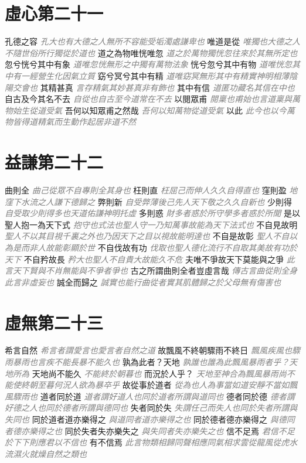 \documentclass[a4paper,zihao=-4,oneside,landscape,UTF8]{ctexart}
\newcommand{\zhushi}[1]{\scriptsize{\textit{\textcolor{gray}{#1}}}\normalsize}
\begin{document}
\section{虛心第二十一}

孔德之容
\zhushi{孔大也有大德之人無所不容能受垢濁處謙卑也}
唯道是從
\zhushi{唯獨也大德之人不隨世俗所行獨從於道也}
道之為物唯恍唯忽
\zhushi{道之於萬物獨恍忽往來於其無所定也}
忽兮恍兮其中有象
\zhushi{道唯忽恍無形之中獨有萬物法象}
恍兮忽兮其中有物
\zhushi{道唯恍忽其中有一經營生化因氣立質}
窈兮冥兮其中有精
\zhushi{道唯窈冥無形其中有精實神明相薄陰陽交會也}
其精甚真
\zhushi{言存精氣其妙甚真非有飾也}
其中有信
\zhushi{道匿功藏名其信在中也}
自古及今其名不去
\zhushi{自從也自古至今道常在不去}
以閱眾甫
\zhushi{閱稟也甫始也言道稟與萬物始生從道受氣}
吾何以知眾甫之然哉
\zhushi{吾何以知萬物從道受氣}
以此
\zhushi{此今也以今萬物皆得道精氣而生動作起居非道不然}


\section{益謙第二十二}

曲則全
\zhushi{曲己從眾不自專則全其身也}
枉則直
\zhushi{枉屈己而伸人久久自得直也}
窪則盈
\zhushi{地窪下水流之人謙下德歸之}
弊則新
\zhushi{自受弊薄後己先人天下敬之久久自新也}
少則得
\zhushi{自受取少則得多也天道佑謙神明托虛}
多則惑
\zhushi{財多者惑於所守學多者惑於所聞}
是以聖人抱一為天下式
\zhushi{抱守也式法也聖人守一乃知萬事故能為天下法式也}
不自見故明
\zhushi{聖人不以其目視千裏之外也乃因天下之目以視故能明達也}
不自是故彰
\zhushi{聖人不自以為是而非人故能彰顯於世}
不自伐故有功
\zhushi{伐取也聖人德化流行不自取其美故有功於天下}
不自矜故長
\zhushi{矜大也聖人不自貴大故能久不危}
夫唯不爭故天下莫能與之爭
\zhushi{此言天下賢與不肖無能與不爭者爭也}
古之所謂曲則全者豈虛言哉
\zhushi{傳古言曲從則全身此言非虛妄也}
誠全而歸之
\zhushi{誠實也能行曲從者實其肌體歸之於父母無有傷害也}


\section{虛無第二十三}

希言自然
\zhushi{希言者謂愛言也愛言者自然之道}
故飄風不終朝驟雨不終日
\zhushi{飄風疾風也驟雨暴雨也言疾不能長暴不能久也}
孰為此者？天地
\zhushi{孰誰也誰為此飄風暴雨者乎？天地所為}
天地尚不能久
\zhushi{不能終於朝暮也}
而況於人乎？
\zhushi{天地至神合為飄風暴雨尚不能使終朝至暮何況人欲為暴卒乎}
故從事於道者
\zhushi{從為也人為事當如道安靜不當如飄風驟雨也}
道者同於道
\zhushi{道者謂好道人也同於道者所謂與道同也}
德者同於德
\zhushi{德者謂好德之人也同於德者所謂與德同也}
失者同於失
\zhushi{失謂任己而失人也同於失者所謂與失同也}
同於道者道亦樂得之
\zhushi{與道同者道亦樂得之也}
同於德者德亦樂得之
\zhushi{與德同者德亦樂得之也}
同於失者失亦樂失之
\zhushi{與失同者失亦樂失之也}
信不足焉
\zhushi{君信不足於下下則應君以不信也}
有不信焉
\zhushi{此言物類相歸同聲相應同氣相求雲從龍風從虎水流濕火就燥自然之類也}
\end{document}
